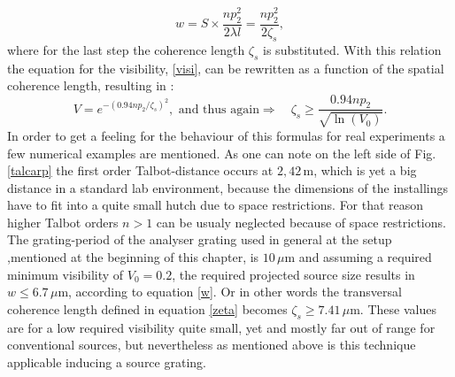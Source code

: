 \begin{equation}
w = S\times \frac{np_{2}^{2}}{2 \lambda l} = \frac{np_{2}^{2}}{2 \zeta_{s}},  
\end{equation}
where for the last step the coherence length $\zeta_{s}$ is substituted. With this relation the equation for the visibility, \ref{visi}, can be rewritten as a function of the spatial coherence length, resulting in \citep{WeitkampPfeiffer2006}:  
\begin{equation}\label{zeta}
V = e^{-(0.94 n p_{2}/ \zeta_{s})^{2}}, \text{ and thus again} \Rightarrow \quad \zeta_{s} \geq \frac{0.94 np_{2}}{\sqrt{\ln(V_{0})}}. 
\end{equation}
In order to get a feeling for the behaviour of this formulas for real experiments a few numerical examples are mentioned. As one can note on the left side of Fig. \ref{talcarp} the first order Talbot-distance occurs at $2,42\, $m, which is yet a big distance in a standard lab environment, because the dimensions of the installings have to fit into a quite small hutch due to space restrictions. For that reason higher Talbot orders $n > 1$ can be usualy neglected because of space restrictions. The grating-period of the analyser grating used in general at the setup ,mentioned at the beginning of this chapter, is $10\, \mu$m and assuming a required minimum visibility of $V_{0}= 0.2$, the required projected source size results in $w \leq 6.7\, \mu$m, according to equation \ref{w}. Or in other words the transversal coherence length defined in equation \ref{zeta} becomes $\zeta_{s} \geq 7.41\, \mu$m. These values are for a low required visibility quite small, yet and mostly far out of range for conventional sources, but nevertheless as mentioned above is this technique applicable inducing a source grating.\\

